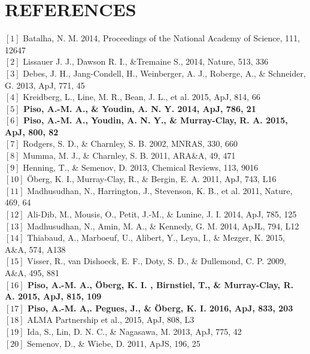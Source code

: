 \documentclass[12pt, letterpaper]{article}
\begin{document}
\section{REFERENCES}
\singlespacing
\noindent $[1]$ Batalha, N. M. 2014, Proceedings of the National Academy of Science, 111, 12647 \\
$[2]$ Lissauer J. J., Dawson R. I., \&Tremaine S., 2014, Nature, 513, 336 \\
$[3]$ Debes, J. H., Jang-Condell, H., Weinberger, A. J., Roberge, A., \& Schneider, G. 2013, ApJ, 771, 45 \\
$[4]$ Kreidberg, L., Line, M. R., Bean, J. L., et al. 2015, ApJ, 814, 66 \\
\textbf{$[5]$ Piso, A.-M. A., \& Youdin, A. N. Y. 2014, ApJ, 786, 21} \\
\textbf{$[6]$ Piso, A.-M. A., Youdin, A. N. Y., \& Murray-Clay, R. A. 2015, ApJ, 800, 82} \\
$[7]$ Rodgers, S. D., \& Charnley, S. B. 2002, MNRAS, 330, 660 \\
$[8]$ Mumma, M. J., \& Charnley, S. B. 2011, ARA\&A, 49, 471 \\
$[9]$ Henning, T., \& Semenov, D. 2013, Chemical Reviews, 113, 9016 \\
$[10]$ \"Oberg, K. I., Murray-Clay, R., \& Bergin, E. A. 2011, ApJ, 743, L16 \\
$[11]$ Madhusudhan, N., Harrington, J., Stevenson, K. B., et al. 2011, Nature, 469, 64 \\
$[12]$ Ali-Dib, M., Mousis, O., Petit, J.-M., \& Lunine, J. I. 2014, ApJ, 785, 125 \\
$[13]$ Madhusudhan, N., Amin, M. A., \& Kennedy, G. M. 2014, ApJL, 794, L12 \\
$[14]$ Thiabaud, A., Marboeuf, U., Alibert, Y., Leya, I., \& Mezger, K. 2015, A\&A, 574, A138 \\
$[15]$ Visser, R., van Dishoeck, E. F., Doty, S. D., \& Dullemond, C. P. 2009, A\&A, 495, 881 \\
\textbf{$[16]$ Piso, A.-M. A., \"Oberg, K. I. , Birnstiel, T., \& Murray-Clay, R. A. 2015, ApJ, 815, 109} \\
\textbf{$[17]$ Piso, A.-M. A,. Pegues, J., \& \"Oberg, K. I.  2016, ApJ, 833, 203} \\
$[18]$ ALMA Partnership et al., 2015, ApJ, 808, L3 \\
$[19]$ Ida, S., Lin, D. N. C., \& Nagasawa, M. 2013, ApJ, 775, 42 \\
$[20]$ Semenov, D., \& Wiebe, D. 2011, ApJS, 196, 25



\end{document}
